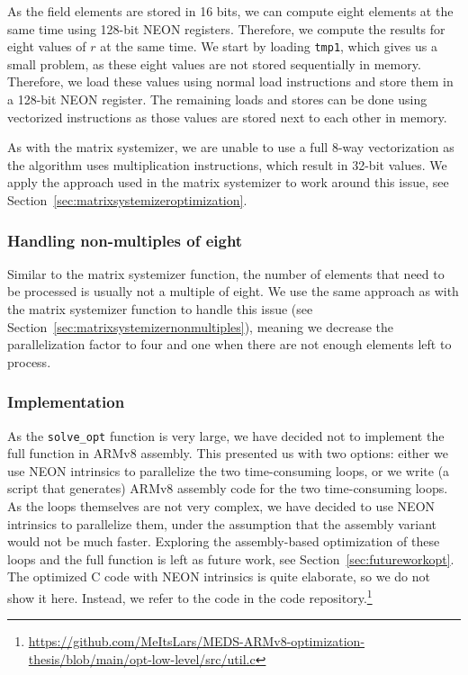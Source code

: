 \documentclass[11pt,a4paper]{report}
\theoremstyle{definition}
\begin{document}
As the field elements are stored in 16 bits, we can compute eight elements at the same time using 128-bit NEON registers. Therefore, we compute the results for eight values of $r$ at the same time. We start by loading \texttt{tmp1}, which gives us a small problem, as these eight values are not stored sequentially in memory. Therefore, we load these values using normal load instructions and store them in a 128-bit NEON register. The remaining loads and stores can be done using vectorized instructions as those values are stored next to each other in memory.

As with the matrix systemizer, we are unable to use a full 8-way vectorization as the algorithm uses multiplication instructions, which result in 32-bit values. We apply the approach used in the matrix systemizer to work around this issue, see Section~\ref{sec:matrixsystemizeroptimization}.

\subsubsection{Handling non-multiples of eight}
Similar to the matrix systemizer function, the number of elements that need to be processed is usually not a multiple of eight. We use the same approach as with the matrix systemizer function to handle this issue (see Section~\ref{sec:matrixsystemizernonmultiples}), meaning we decrease the parallelization factor to four and one when there are not enough elements left to process.

\subsubsection{Implementation}
As the \texttt{solve\_opt} function is very large, we have decided not to implement the full function in ARMv8 assembly. This presented us with two options: either we use NEON intrinsics to parallelize the two time-consuming loops, or we write (a script that generates) ARMv8 assembly code for the two time-consuming loops. As the loops themselves are not very complex, we have decided to use NEON intrinsics to parallelize them, under the assumption that the assembly variant would not be much faster. Exploring the assembly-based optimization of these loops and the full function is left as future work, see Section~\ref{sec:futureworkopt}. The optimized C code with NEON intrinsics is quite elaborate, so we do not show it here. Instead, we refer to the code in the code repository.\footnote{\url{https://github.com/MeItsLars/MEDS-ARMv8-optimization-thesis/blob/main/opt-low-level/src/util.c}}
\end{document}
